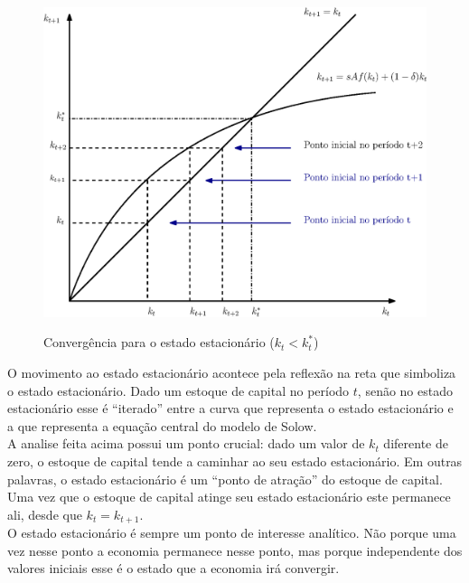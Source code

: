 \documentclass[11pt,a4paper]{article}
\begin{document}
\begin{figure}[!h]
\centering
\caption{Convergência para o estado estacionário ($k_t < k_t ^{\ast}$)} \vspace{2ex}
\includegraphics[scale=.5]{solow02.eps}
\label{fig:convergencia}
\end{figure}

O movimento ao estado estacionário acontece pela reflexão na reta que simboliza o estado estacionário. Dado um estoque de capital no período $t$, senão no estado estacionário esse é ``iterado'' entre a curva que representa o estado estacionário e a que representa a equação central do modelo de Solow.\\

A analise feita acima possui um ponto crucial: dado um valor de $k_t$ diferente de zero, o estoque de capital tende a caminhar ao seu estado estacionário. Em outras palavras, o estado estacionário é um ``ponto de atração'' do estoque de capital. Uma vez que o estoque de capital atinge seu estado estacionário este permanece ali, desde que $k_t = k_{t+1}$.\\

O estado estacionário é sempre um ponto de interesse analítico. Não porque uma vez nesse ponto a economia permanece nesse ponto, mas porque independente dos valores iniciais esse é o estado que a economia irá convergir.
\end{document}
